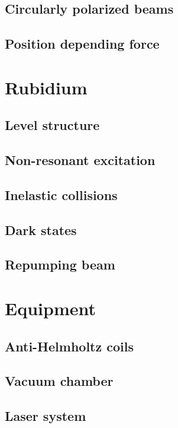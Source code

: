 \documentclass[11pt, english, fleqn, DIV=15, headinclude, BCOR=2cm]{scrreprt}
\begin{document}
\subsection{Circularly polarized beams}

\subsection{Position depending force}

\section{Rubidium}

\subsection{Level structure}

\subsection{Non-resonant excitation}

\subsection{Inelastic collisions}

\subsection{Dark states}

\subsection{Repumping beam}

\section{Equipment}

\subsection{Anti-Helmholtz coils}

\subsection{Vacuum chamber}

\subsection{Laser system}
\end{document}
